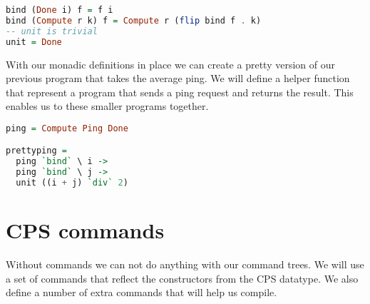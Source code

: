 \begin{lstlisting}[language=Haskell]
bind (Done i) f = f i
bind (Compute r k) f = Compute r (flip bind f . k)
-- unit is trivial
unit = Done
\end{lstlisting}

With our monadic definitions in place we can create a pretty version of our previous program that takes the average ping. We will define a helper function that represent a program that sends a ping request and returns the result. This enables us to  these smaller programs together.

\begin{lstlisting}[language=Haskell]
ping = Compute Ping Done

prettyping =
  ping `bind` \ i ->
  ping `bind` \ j ->
  unit ((i + j) `div` 2)
\end{lstlisting}


\section{\label{cpscommands}CPS commands}
Without commands we can not do anything with our command trees. We will use a set of commands that reflect the constructors from the \ac{CPS} datatype. We also define a number of extra commands that will help us compile. 

% 
